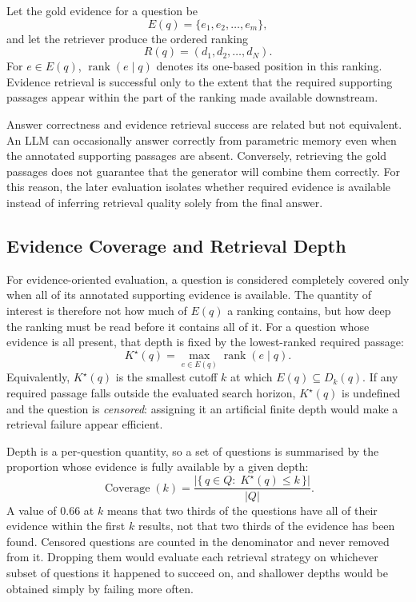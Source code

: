 Let the gold evidence for a question be
\begin{equation}
  E(q)=\{e_1,e_2,\ldots,e_m\},
  \label{eq:gold-evidence}
\end{equation}
and let the retriever produce the ordered ranking
\begin{equation}
  R(q)=(d_1,d_2,\ldots,d_N).
  \label{eq:retrieval-ranking}
\end{equation}
For \(e\in E(q)\), \(\operatorname{rank}(e\mid q)\) denotes its one-based
position in this ranking. Evidence retrieval is successful only to the extent
that the required supporting passages appear within the part of the ranking made
available downstream.

Answer correctness and evidence retrieval success are related but not
equivalent. An LLM can occasionally answer correctly from parametric memory even
when the annotated supporting passages are absent. Conversely, retrieving the
gold passages does not guarantee that the generator will combine them correctly.
For this reason, the later evaluation isolates whether required evidence is
available instead of inferring retrieval quality solely from the final answer.

\subsection{Evidence Coverage and Retrieval Depth}
\label{subsec:coverage-depth}

For evidence-oriented evaluation, a question is considered completely covered only when all of its annotated supporting evidence is available. The quantity
of interest is therefore not how much of \(E(q)\) a ranking contains, but how
deep the ranking must be read before it contains all of it. For a question whose
evidence is all present, that depth is fixed by the lowest-ranked required
passage:
\begin{equation}
  K^{\star}(q)=\max_{e\in E(q)}\operatorname{rank}(e\mid q).
  \label{eq:min-complete-depth}
\end{equation}
Equivalently, \(K^{\star}(q)\) is the smallest cutoff \(k\) at which
\(E(q)\subseteq D_k(q)\). If any required passage falls outside the evaluated
search horizon, \(K^{\star}(q)\) is undefined and the question is
\emph{censored}: assigning it an artificial finite depth would make a retrieval
failure appear efficient.

Depth is a per-question quantity, so a set of questions is summarised by the
proportion whose evidence is fully available by a given depth:
\begin{equation}
  \operatorname{Coverage}(k)
  =\frac{\bigl|\{\,q\in Q:\;K^{\star}(q)\le k\,\}\bigr|}{|Q|}.
  \label{eq:coverage-at-k}
\end{equation}
A value of \(0.66\) at \(k\) means that two thirds of the questions have all of
their evidence within the first \(k\) results, not that two thirds of the
evidence has been found. Censored questions are counted in the denominator and
never removed from it. Dropping them would evaluate each retrieval strategy on
whichever subset of questions it happened to succeed on, and shallower depths
would be obtained simply by failing more often.

